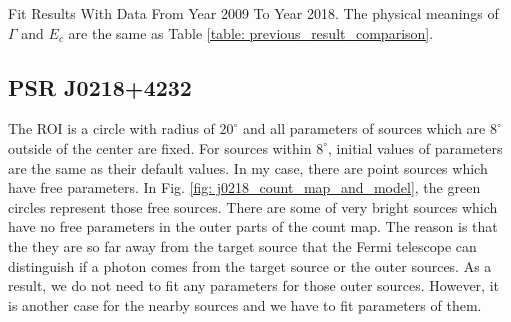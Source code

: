 \documentclass[12pt]{report}
\newcommand{\mycaption}[1]{\protect \caption{#1}}
\begin{document}
          \begin{table}[!ht]
            \centering
            \mycaption{Fit Results With Data From Year 2009 To Year 2018. The physical meanings of 
            $\Gamma$ and $E_c$ are the same as Table \ref{table: previous_result_comparison}.}
            \label{table: 2018_fit_data}
          \end{table}
          \vspace{1cm}            
            

        \subsection{PSR J0218+4232}
          \label{j0218}
          The ROI is a circle with radius of $20^\circ$ and all parameters of sources which are $8^\circ$ outside 
          of the center are fixed. For sources within $8^\circ$, initial values of parameters are the same as
          their default values.
          In my case, there are point sources which have free parameters. 
          In Fig.
          \ref{fig: j0218_count_map_and_model}, the green circles represent those free sources.
          There are some of very bright sources which have no free parameters
          in the outer parts of the count map. The reason is that the they are so far away from the target source
          that the Fermi telescope can distinguish if a photon comes from the target source or the outer sources.
          As a result, we do not need to fit any parameters for those outer sources. 
          However, it is another case for the nearby sources and we have to fit parameters of them.
          
\end{document}
